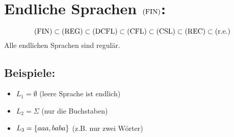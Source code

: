 \chapter{Endliche Sprachen $\mathrm{(FIN)}$: }
\begin{equation*}
	\mathrm{(FIN)}\subset\mathrm{(REG)}\subset\mathrm{(DCFL)}\subset\mathrm{(CFL)}\subset\mathrm{(CSL)}\subset\mathrm{(REC)}\subset\mathrm{(r.e.)}
\end{equation*}
Alle endlichen Sprachen sind regulär.

\section{Beispiele: }
\begin{itemize}
	\item $L_1=\emptyset$ (leere Sprache ist endlich)
	\item $L_2=\Sigma$ (nur die Buchstaben)
	\item $L_3=\left\{ aaa,baba \right\}$ (z.B. nur zwei Wörter)
\end{itemize}
